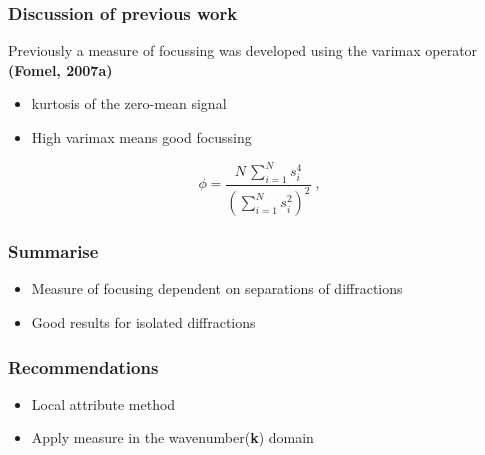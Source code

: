 \begin{frame}
   \begin{multicols}{2}
      {}
      {}
   \end{multicols}

	
\end{frame}
\begin{frame} 
 
\end{frame}



\begin{frame} \frametitle{Discussion of previous work}
Previously a measure of focussing was developed using the varimax operator \textbf{(Fomel, 2007a)}

\begin{itemize}
   \item kurtosis of the zero-mean signal
   \item High varimax means good focussing 
\end{itemize}
\begin{equation}
  \label{eq:focus} \phi = \frac{\displaystyle N\,\sum_{i=1}^N
  s_i^4}{\displaystyle \left(\sum_{i=1}^{N} s_i^2\right)^2}\;,
\end{equation}

\end{frame}
\cwpnote{}

\begin{frame} \frametitle{Summarise}

   \begin{itemize} 
    \item Measure of focusing dependent on separations of diffractions
    \item Good results for isolated diffractions 
     \end{itemize}
\end{frame}

\begin{frame} \frametitle{Recommendations}

   \begin{itemize} 
    \item Local attribute method
    \item Apply measure in the wavenumber(\textbf{k}) domain
     \end{itemize}
\end{frame}

